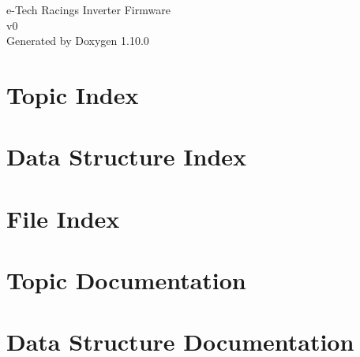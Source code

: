 \documentclass[twoside]{book}
\newcommand{\+}{\discretionary{\mbox{\scriptsize$\hookleftarrow$}}{}{}}
\newcommand{\clearemptydoublepage}{%
    \newpage{\pagestyle{empty}\cleardoublepage}%
  }
\begin{document}
  \raggedbottom
    \hypersetup{pageanchor=false,
                bookmarksnumbered=true,
                pdfencoding=unicode
               }
  \begin{titlepage}
  \vspace*{7cm}
  \begin{center}%
  {\Large e-\/\+Tech Racing\textquotesingle{}s Inverter Firmware}\\
  [1ex]\large v0 \\
  \vspace*{1cm}
  {\large Generated by Doxygen 1.10.0}\\
  \end{center}
  \end{titlepage}
  \clearemptydoublepage
  \tableofcontents
  \clearemptydoublepage
  \hypersetup{pageanchor=true}
\chapter{Topic Index}

\chapter{Data Structure Index}

\chapter{File Index}

\chapter{Topic Documentation}






\chapter{Data Structure Documentation}


























\end{document}

